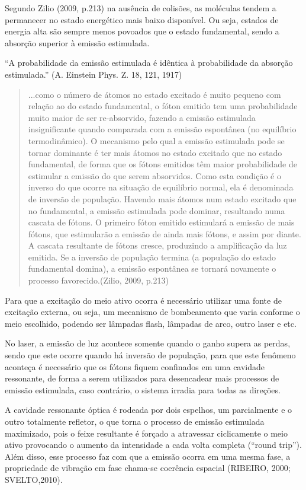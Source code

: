 Segundo Zilio (2009, p.213) na ausência de colisões, as moléculas tendem a permanecer no estado energético mais baixo disponível. Ou seja, estados de energia alta são sempre menos povoados que o estado fundamental, sendo a absorção superior à emissão estimulada.

``A probabilidade da emissão estimulada é idêntica à probabilidade da absorção estimulada.'' (A. Einstein Phys. Z. 18, 121, 1917)

\begin{quote}
...como o número de átomos no estado excitado é muito pequeno com relação ao do estado fundamental, o fóton emitido tem uma probabilidade muito maior de ser re-absorvido, fazendo a emissão estimulada insignificante quando comparada com a emissão espontânea (no equilíbrio termodinâmico). O mecanismo pelo qual a emissão estimulada pode se tornar dominante é ter mais átomos no estado excitado que no estado fundamental, de forma que os fótons emitidos têm maior probabilidade de estimular a emissão do que serem absorvidos. Como esta condição é o inverso do que ocorre na situação de equilíbrio normal, ela é denominada de inversão de população. Havendo mais átomos num estado excitado que no fundamental, a emissão estimulada pode dominar, resultando numa cascata de fótons. O primeiro fóton emitido estimulará a emissão de mais fótons, que estimularão a emissão de ainda mais fótons, e assim por diante. A cascata resultante de fótons cresce, produzindo a amplificação da luz emitida. Se a inversão de população termina (a população do estado fundamental domina), a emissão espontânea se tornará novamente o processo favorecido.(Zilio, 2009, p.213)
\end{quote}

Para que a excitação do meio ativo ocorra é necessário utilizar uma fonte de excitação externa, ou seja, um mecanismo de bombeamento que varia conforme o meio escolhido, podendo ser lâmpadas flash, lâmpadas de arco, outro laser e etc.

No laser, a emissão de luz acontece somente quando o ganho supera as perdas, sendo que este ocorre quando há inversão de população, para que este fenômeno aconteça é necessário que os fótons fiquem confinados em uma cavidade ressonante, de forma a serem utilizados para desencadear mais processos de emissão estimulada, caso contrário, o sistema irradia para todas as direções.

A cavidade ressonante óptica é rodeada por dois espelhos, um parcialmente e o outro totalmente refletor, o que torna o processo de emissão estimulada maximizado, pois o feixe resultante é forçado a atravessar ciclicamente o meio ativo provocando o aumento da intensidade a cada volta completa (``round trip''). Além disso, esse processo faz com que a emissão ocorra em uma mesma fase, a propriedade de vibração em fase chama-se coerência espacial (RIBEIRO, 2000; SVELTO,2010).

